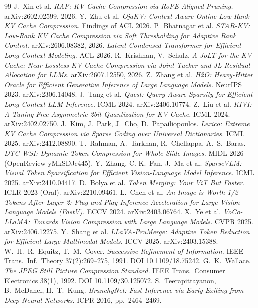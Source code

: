 \documentclass[11pt]{article}
\begin{document}
\begin{thebibliography}{99}
 J.~Xin et al. \emph{RAP: KV-Cache Compression via RoPE-Aligned Pruning.} arXiv:2602.02599, 2026.
 Y.~Zhu et al. \emph{OjaKV: Context-Aware Online Low-Rank KV Cache Compression.} Findings of ACL 2026.
 P.~Bhatnagar et al. \emph{STAR-KV: Low-Rank KV Cache Compression via Soft Thresholding for Adaptive Rank Control.} arXiv:2606.08382, 2026.
 \emph{Latent-Condensed Transformer for Efficient Long Context Modeling.} ACL 2026.
 R.~Krishnan, V.~Schulz. \emph{A JoLT for the KV Cache: Near-Lossless KV Cache Compression via Joint Tucker and JL-Residual Allocation for LLMs.} arXiv:2607.12550, 2026.
 Z.~Zhang et al. \emph{H2O: Heavy-Hitter Oracle for Efficient Generative Inference of Large Language Models.} NeurIPS 2023. arXiv:2306.14048.
 J.~Tang et al. \emph{Quest: Query-Aware Sparsity for Efficient Long-Context LLM Inference.} ICML 2024. arXiv:2406.10774.
 Z.~Liu et al. \emph{KIVI: A Tuning-Free Asymmetric 2bit Quantization for KV Cache.} ICML 2024. arXiv:2402.02750.
 J.~Kim, J.~Park, J.~Cho, D.~Papailiopoulos. \emph{Lexico: Extreme KV Cache Compression via Sparse Coding over Universal Dictionaries.} ICML 2025. arXiv:2412.08890.
 T.~Rahman, A.~Tarkhan, R.~Chellappa, A.~S.~Baras. \emph{DTC-WSI: Dynamic Token Compression for Whole-Slide Images.} MIDL 2026 (OpenReview yMkSDJc445).
 Y.~Zhang, C.-K.~Fan, J.~Ma et al. \emph{SparseVLM: Visual Token Sparsification for Efficient Vision-Language Model Inference.} ICML 2025. arXiv:2410.04417.
 D.~Bolya et al. \emph{Token Merging: Your ViT But Faster.} ICLR 2023 (Oral). arXiv:2210.09461.
 L.~Chen et al. \emph{An Image is Worth 1/2 Tokens After Layer 2: Plug-and-Play Inference Acceleration for Large Vision-Language Models (FastV).} ECCV 2024. arXiv:2403.06764.
 X.~Ye et al. \emph{VoCo-LLaMA: Towards Vision Compression with Large Language Models.} CVPR 2025. arXiv:2406.12275.
 Y.~Shang et al. \emph{LLaVA-PruMerge: Adaptive Token Reduction for Efficient Large Multimodal Models.} ICCV 2025. arXiv:2403.15388.
 W.~H.~R.~Equitz, T.~M.~Cover. \emph{Successive Refinement of Information.} IEEE Trans.~Inf.~Theory 37(2):269--275, 1991. DOI 10.1109/18.75242.
 G.~K.~Wallace. \emph{The JPEG Still Picture Compression Standard.} IEEE Trans.~Consumer Electronics 38(1), 1992. DOI 10.1109/30.125072.
 S.~Teerapittayanon, B.~McDanel, H.~T.~Kung. \emph{BranchyNet: Fast Inference via Early Exiting from Deep Neural Networks.} ICPR 2016, pp.~2464--2469.

\end{thebibliography}
\end{document}
